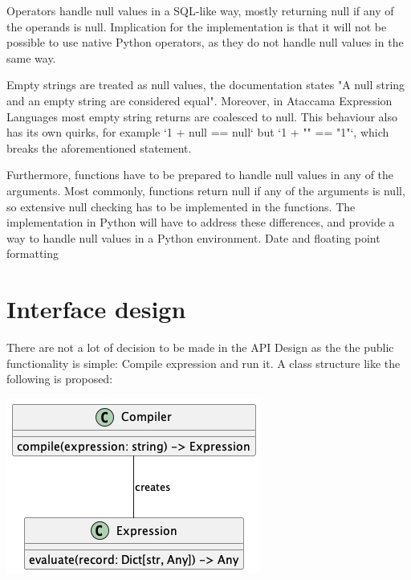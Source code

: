 Operators handle null values in a SQL-like way, mostly returning null if any
of the operands is null. Implication for the implementation is that it will not be
possible to use native Python operators, as they do not handle null values in the
same way.

Empty strings are treated as null values, the documentation states "A null
string and an empty string are considered equal". Moreover, in Ataccama Expression Languages most empty string
returns are coalesced to null. This behaviour also has its own quirks, for example
‘1 + null == null‘ but ‘1 + "" == "1"‘, which breaks the aforementioned statement.

Furthermore, functions have to be prepared to handle null values in any of the
arguments. Most commonly, functions return null if any of the arguments is null,
so extensive null checking has to be implemented in the functions.
The implementation in Python will have to address these differences, and
provide a way to handle null values in a Python environment.
Date and floating point formatting

\section{Interface design}

There are not a lot of decision to be made in the API Design as the the public
functionality is simple: Compile expression and run it. A class structure like the following is proposed:

\includegraphics[scale=0.7]{diagrams/api_design-class.png}





